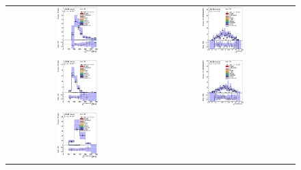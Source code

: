 \clearpage
\begin{figure}[htbp]
\begin{center}
\begin{tabular}{cc}
%
\includegraphics[width=0.30\textwidth]{appendices/figures/sdrs/JetPt1_ELEMUONCR6_1W_NOMINAL.eps} &
\includegraphics[width=0.30\textwidth]{appendices/figures/sdrs/JetEta1_ELEMUONCR6_1W_NOMINAL.eps} \\
\includegraphics[width=0.30\textwidth]{appendices/figures/sdrs/JetPt2_ELEMUONCR6_1W_NOMINAL.eps} &
\includegraphics[width=0.30\textwidth]{appendices/figures/sdrs/JetEta2_ELEMUONCR6_1W_NOMINAL.eps} \\
\includegraphics[width=0.30\textwidth]{appendices/figures/sdrs/JetPt3_ELEMUONCR6_1W_NOMINAL.eps} &

\end{tabular}
\end{center}
\end{figure}
